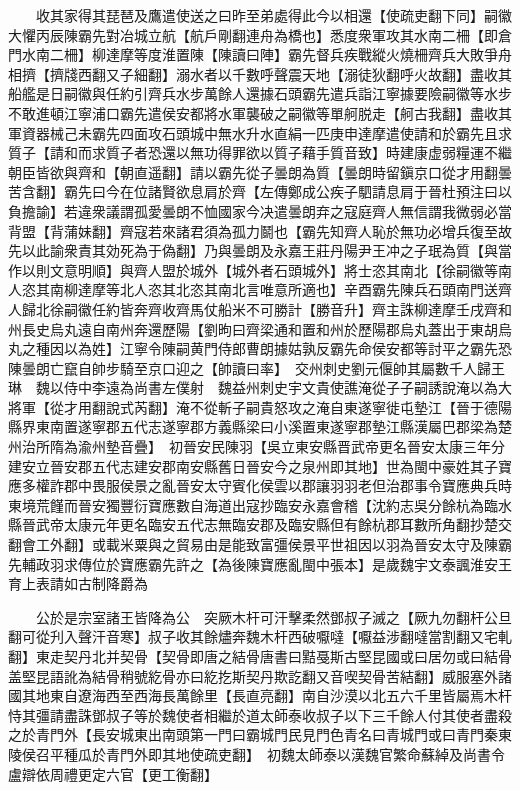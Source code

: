 　　收其家得其琵琶及鷹遣使送之曰昨至弟處得此今以相還【使疏吏翻下同】嗣徽大懼丙辰陳霸先對冶城立航【航戶剛翻連舟為橋也】悉度衆軍攻其水南二柵【即倉門水南二柵】柳達摩等度淮置陳【陳讀曰陣】霸先督兵疾戰縱火燒柵齊兵大敗爭舟相擠【擠牋西翻又子細翻】溺水者以千數呼聲震天地【溺徒狄翻呼火故翻】盡收其船艦是日嗣徽與任約引齊兵水步萬餘人還據石頭霸先遣兵詣江寧據要險嗣徽等水步不敢進頓江寧浦口霸先遣侯安都將水軍襲破之嗣徽等單舸脱走【舸古我翻】盡收其軍資器械己未霸先四面攻石頭城中無水升水直絹一匹庚申達摩遣使請和於霸先且求質子【請和而求質子者恐還以無功得罪欲以質子藉手質音致】時建康虚弱糧運不繼朝臣皆欲與齊和【朝直遥翻】請以霸先從子曇朗為質【曇朗時留鎭京口從才用翻曇苦含翻】霸先曰今在位諸賢欲息肩於齊【左傳鄭成公疾子駟請息肩于晉杜預注曰以負擔諭】若違衆議謂孤愛曇朗不恤國家今决遣曇朗弃之寇庭齊人無信謂我微弱必當背盟【背蒲妹翻】齊寇若來諸君須為孤力鬬也【霸先知齊人恥於無功必增兵復至故先以此諭衆責其効死為于偽翻】乃與曇朗及永嘉王莊丹陽尹王冲之子珉為質【與當作以則文意明順】與齊人盟於城外【城外者石頭城外】將士恣其南北【徐嗣徽等南人恣其南柳達摩等北人恣其北恣其南北言唯意所適也】辛酉霸先陳兵石頭南門送齊人歸北徐嗣徽任約皆奔齊收齊馬仗船米不可勝計【勝音升】齊主誅柳達摩壬戌齊和州長史烏丸遠自南州奔還歷陽【劉昫曰齊梁通和置和州於歷陽郡烏丸蓋出于東胡烏丸之種因以為姓】江寧令陳嗣黄門侍郎曹朗據姑孰反霸先命侯安都等討平之霸先恐陳曇朗亡竄自帥步騎至京口迎之【帥讀曰率】　交州刺史劉元偃帥其屬數千人歸王琳　魏以侍中李遠為尚書左僕射　魏益州刺史宇文貴使譙淹從子子嗣誘說淹以為大將軍【從才用翻說式芮翻】淹不從斬子嗣貴怒攻之淹自東遂寧徙屯墊江【晉于德陽縣界東南置遂寧郡五代志遂寧郡方義縣梁曰小溪置東遂寧郡墊江縣漢屬巴郡梁為楚州治所隋為渝州墊音疊】　初晉安民陳羽【吳立東安縣晋武帝更名晉安太康三年分建安立晉安郡五代志建安郡南安縣舊日晉安今之泉州即其地】世為閩中豪姓其子寶應多權詐郡中畏服侯景之亂晉安太守賓化侯雲以郡讓羽羽老但治郡事令寶應典兵時東境荒饉而晉安獨豐衍寶應數自海道出寇抄臨安永嘉會稽【沈約志吳分餘杭為臨水縣晉武帝太康元年更名臨安五代志無臨安郡及臨安縣但有餘杭郡耳數所角翻抄楚交翻會工外翻】或載米粟與之貿易由是能致富彊侯景平世祖因以羽為晉安太守及陳霸先輔政羽求傳位於寶應霸先許之【為後陳寶應亂閩中張本】是歲魏宇文泰諷淮安王育上表請如古制降爵為

　　公於是宗室諸王皆降為公　突厥木杆可汗擊柔然鄧叔子滅之【厥九勿翻杆公旦翻可從刋入聲汗音寒】叔子收其餘燼奔魏木杆西破嚈噠【嚈益涉翻噠當割翻又宅軋翻】東走契丹北并契骨【契骨即唐之結骨唐書曰黠戞斯古堅昆國或曰居勿或曰結骨盖堅昆語訛為結骨稍號紇骨亦曰紇扢斯契丹欺訖翻又音喫契骨苦結翻】威服塞外諸國其地東自遼海西至西海長萬餘里【長直亮翻】南自沙漠以北五六千里皆屬焉木杆恃其彊請盡誅鄧叔子等於魏使者相繼於道太師泰收叔子以下三千餘人付其使者盡殺之於青門外【長安城東出南頭第一門曰霸城門民見門色青名曰青城門或曰青門秦東陵侯召平種瓜於青門外即其地使疏吏翻】　初魏太師泰以漢魏官繁命蘇綽及尚書令盧辯依周禮更定六官【更工衡翻】

